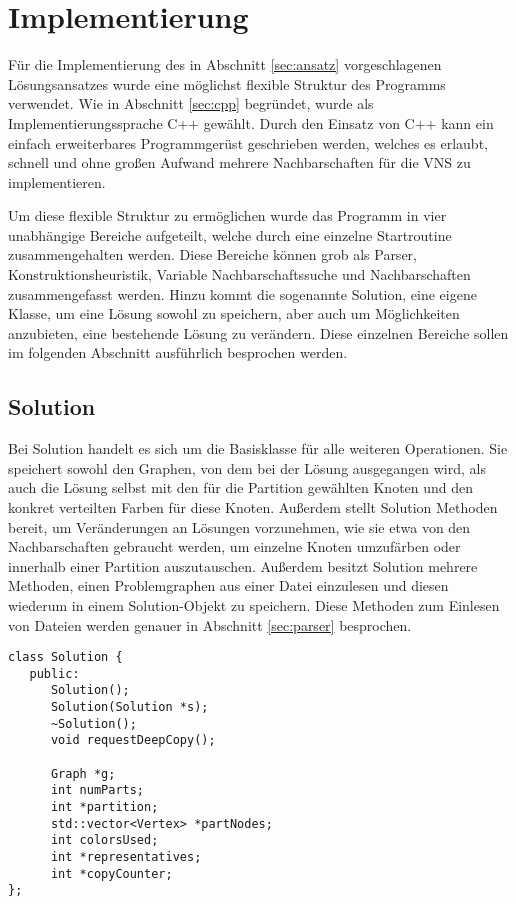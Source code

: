 \chapter{Implementierung}
Für die Implementierung des in Abschnitt \ref{sec:ansatz} vorgeschlagenen Lösungsansatzes wurde eine möglichst flexible Struktur des Programms verwendet. Wie in Abschnitt \ref{sec:cpp} begründet, wurde
als Implementierungssprache C++ gewählt. Durch den Einsatz von C++ kann ein einfach erweiterbares Programmgerüst geschrieben werden, welches es erlaubt, schnell und ohne großen Aufwand mehrere Nachbarschaften
für die VNS zu implementieren. 

Um diese flexible Struktur zu ermöglichen wurde das Programm in vier unabhängige Be\-rei\-che aufgeteilt, welche durch eine einzelne Startroutine zusammengehalten werden. Diese Be\-rei\-che können grob als Parser, 
Konstruktionsheuristik, Variable Nachbarschaftssuche und Nachbarschaften zusammengefasst werden. Hinzu kommt die sogenannte Solution, eine eigene Klasse, um eine Lösung sowohl zu speichern, aber auch um Möglichkeiten
anzubieten, eine bestehende Lösung zu verändern. Diese einzelnen Be\-rei\-che sollen im folgenden Abschnitt ausführlich besprochen werden.

\section{Solution}
Bei Solution handelt es sich um die Basisklasse für alle weiteren Operationen. Sie speichert sowohl den Graphen, von dem bei der Lösung ausgegangen wird, als auch die Lösung selbst mit den für die Partition gewählten Knoten und den konkret verteilten Farben
für diese Knoten. Außerdem stellt Solution Methoden bereit, um Veränderungen an Lösungen vorzunehmen, wie sie etwa von den Nachbarschaften gebraucht werden, um einzelne Knoten umzufärben oder innerhalb einer Partition auszutauschen.
Außerdem besitzt Solution mehrere Methoden, einen Problemgraphen aus einer Datei einzulesen und diesen wiederum in einem Solution-Objekt zu speichern. Diese Methoden zum Einlesen von Dateien werden genauer 
in Abschnitt \ref{sec:parser} besprochen.

\singlespacing
\begin{lstlisting}[caption={Ein Ausschnitt aus der Signatur der Solutionklasse},label=lst:solution]
class Solution {
   public:
      Solution();
      Solution(Solution *s);
      ~Solution(); 
      void requestDeepCopy();

      Graph *g;
      int numParts;
      int *partition;
      std::vector<Vertex> *partNodes;
      int colorsUsed;
      int *representatives;
      int *copyCounter;
};
\end{lstlisting}


